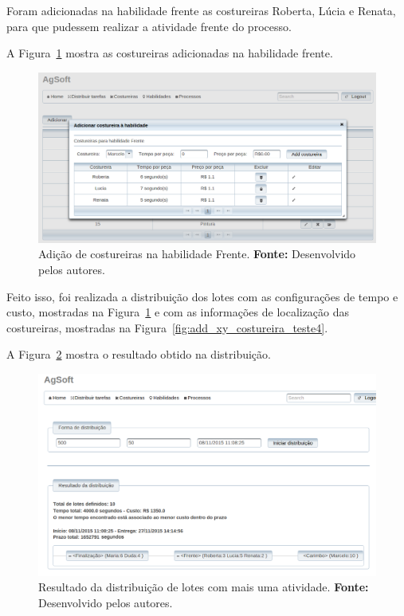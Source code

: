 \par Foram adicionadas na habilidade frente as costureiras Roberta, Lúcia e
Renata, para que pudessem realizar a atividade frente do processo.
\par A Figura~\ref{fig:add_costureira_frente_teste4} mostra as costureiras
adicionadas na habilidade frente.

\begin{figure}[h!]
	\centerline{\includegraphics[width=14cm]{./imagens/costureiras_at_frente_tete5.png}}
	\caption[Adição de costureiras na habilidade Frente.]
	{Adição de costureiras na habilidade Frente. \textbf{Fonte:} Desenvolvido pelos
	autores.}
	\label{fig:add_costureira_frente_teste4}
\end{figure}

\par Feito isso, foi realizada a distribuição dos lotes com as configurações de
tempo e custo, mostradas na Figura~\ref{fig:add_costureira_frente_teste4} e com
as informações de localização das costureiras, mostradas na
Figura~\ref{fig:add_xy_costureira_teste4}.
\par A Figura~\ref{fig:resultado1_teste5} mostra o resultado obtido na
distribuição.

\newpage

\begin{figure}[h!]
	\centerline{\includegraphics[width=14.7cm]{./imagens/resultado1_teste5.png}}
	\caption[Resultado da distribuição de lotes com mais uma atividade.]
	{Resultado da distribuição de lotes com mais uma atividade. \textbf{Fonte:} Desenvolvido pelos
	autores.}
	\label{fig:resultado1_teste5}
\end{figure}

